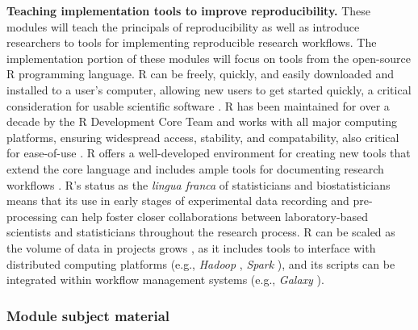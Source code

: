 \documentclass[pdftex,english,11pt,parskip=half]{scrartcl}
\begin{document}
\textbf{Teaching implementation tools to improve reproducibility.} These modules will teach the principals of reproducibility as well as introduce researchers to tools for implementing reproducible research workflows. The implementation portion of these modules will focus on tools from the open-source R programming language. R can be freely, quickly, and easily downloaded and installed to a user's computer, allowing new users to get started quickly, a critical consideration for usable scientific software \cite{list2017ten}. R has been maintained for over a decade by the R Development Core Team and works with all major computing platforms, ensuring  widespread access, stability, and compatability, also critical for ease-of-use \cite{baumer2017lessons, altschul2013anatomy}. R offers a well-developed environment for creating new tools that extend the core language \cite{wickham2015r} and includes ample tools for documenting research workflows \cite{xie2015dynamic, xie2016bookdown}. R's status as the \textit{lingua franca} of statisticians and biostatisticians means that its use in early stages of experimental data recording and pre-processing can help foster closer collaborations between laboratory-based scientists and statisticians throughout the research process. R can be scaled as the volume of data in projects grows \cite{list2017ten}, as it includes tools to interface with distributed computing platforms (e.g., \textit{Hadoop} \cite{pathak2014rhadoop}, \textit{Spark} \cite{sparklyr}), and its scripts can be integrated within workflow management systems (e.g., \textit{Galaxy} \cite{goecks2010galaxy, walker2016models}). 

\subsubsection{Module subject material}
\end{document}
